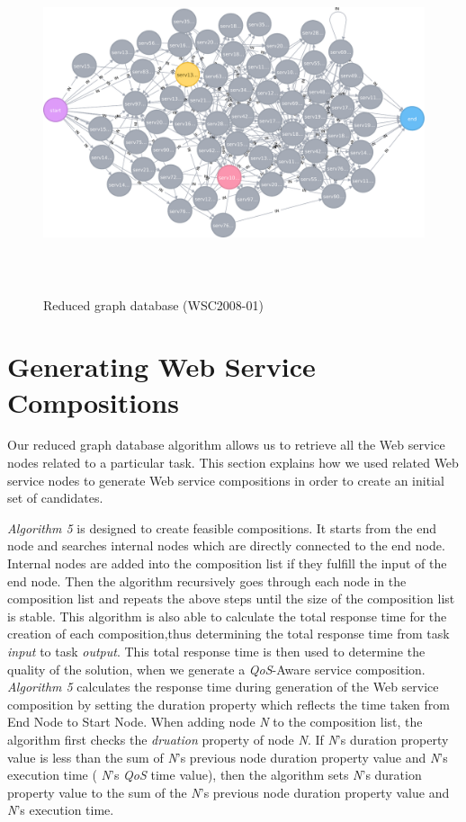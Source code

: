 \begin{figure}[H]
\includegraphics[width = 13cm, height = 10cm, scale = 0.5]{svg-reduced.pdf}
\centering
\caption{Reduced graph database (WSC2008-01)}
\label{fig:reduced} 
\end{figure} 

\section{Generating Web Service Compositions} \label{generatingComp}
Our reduced graph database algorithm allows us to retrieve all the Web service nodes related to a particular task. This section explains how we used related Web service nodes to generate Web service compositions in order to create an initial set of candidates.\par

\emph{Algorithm 5} is designed to create feasible compositions. It starts from the end node and searches internal nodes which are directly connected to the end node. Internal nodes are added into the composition list if they fulfill the input of the end node. Then the algorithm recursively goes through each node in the composition list and repeats the above steps until the size of the composition list is stable. This algorithm is also able to calculate the total response time for the creation of each composition,thus determining the total response time from task \emph{input} to task \emph{output}. This total  response time is then used to determine the quality of the solution, when we generate a \emph{QoS}-Aware service composition. \emph{Algorithm 5} calculates the response time during generation of the Web service composition by setting the duration property which reflects the time taken from End Node to Start Node. When adding node \emph{N} to the composition list, the algorithm first checks the \emph{druation} property of node \emph{N}. If \emph{N}'s duration property value is less than the sum of \emph{N}'s previous node  duration property value and  \emph{N}'s execution time ( \emph{N}'s \emph{QoS} time value), then the algorithm sets  \emph{N}'s duration property value to the sum of the  \emph{N}'s previous node duration property value and  \emph{N}'s execution time.\par

